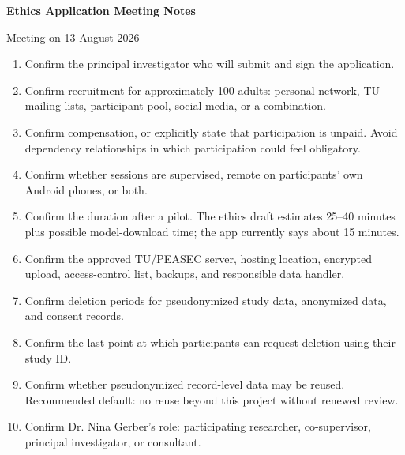 \documentclass[10pt]{article}
\begin{document}
\begin{center}
{\Large\bfseries Ethics Application Meeting Notes}\par
\vspace{0.25em}
{\large Meeting on 13 August 2026}\par
\end{center}

\begin{enumerate}
  \item Confirm the principal investigator who will submit and sign the application.
  \item Confirm recruitment for approximately 100 adults: personal network, TU mailing lists, participant pool, social media, or a combination.
  \item Confirm compensation, or explicitly state that participation is unpaid. Avoid dependency relationships in which participation could feel obligatory.
  \item Confirm whether sessions are supervised, remote on participants' own Android phones, or both.
  \item Confirm the duration after a pilot. The ethics draft estimates 25--40 minutes plus possible model-download time; the app currently says about 15 minutes.
  \item Confirm the approved TU/PEASEC server, hosting location, encrypted upload, access-control list, backups, and responsible data handler.
  \item Confirm deletion periods for pseudonymized study data, anonymized data, and consent records.
  \item Confirm the last point at which participants can request deletion using their study ID.
  \item Confirm whether pseudonymized record-level data may be reused. Recommended default: no reuse beyond this project without renewed review.
  \item Confirm Dr. Nina Gerber's role: participating researcher, co-supervisor, principal investigator, or consultant.
\end{enumerate}
\end{document}
